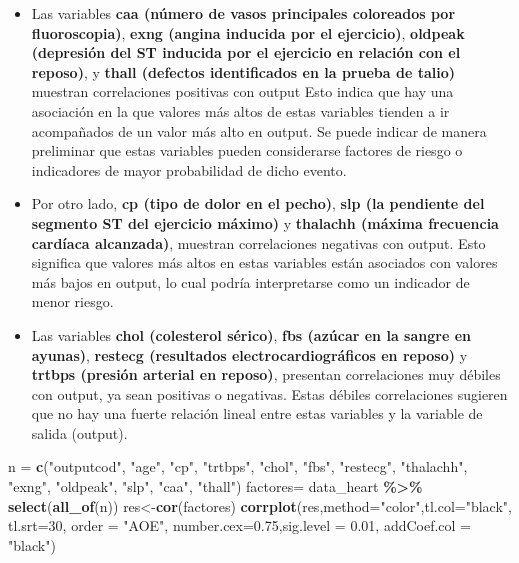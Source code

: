\documentclass[
]{article}
\newenvironment{Shaded}{\begin{snugshade}}{\end{snugshade}}
\newcommand{\AttributeTok}[1]{\textcolor[rgb]{0.13,0.29,0.53}{#1}}
\newcommand{\DecValTok}[1]{\textcolor[rgb]{0.00,0.00,0.81}{#1}}
\newcommand{\FloatTok}[1]{\textcolor[rgb]{0.00,0.00,0.81}{#1}}
\newcommand{\FunctionTok}[1]{\textcolor[rgb]{0.13,0.29,0.53}{\textbf{#1}}}
\newcommand{\NormalTok}[1]{#1}
\newcommand{\OtherTok}[1]{\textcolor[rgb]{0.56,0.35,0.01}{#1}}
\newcommand{\SpecialCharTok}[1]{\textcolor[rgb]{0.81,0.36,0.00}{\textbf{#1}}}
\newcommand{\StringTok}[1]{\textcolor[rgb]{0.31,0.60,0.02}{#1}}
\begin{document}
\begin{itemize}
\item
  Las variables \textbf{caa (número de vasos principales coloreados por
  fluoroscopia)}, \textbf{exng (angina inducida por el ejercicio)},
  \textbf{oldpeak (depresión del ST inducida por el ejercicio en
  relación con el reposo)}, y \textbf{thall (defectos identificados en
  la prueba de talio)} muestran correlaciones positivas con output Esto
  indica que hay una asociación en la que valores más altos de estas
  variables tienden a ir acompañados de un valor más alto en output. Se
  puede indicar de manera preliminar que estas variables pueden
  considerarse factores de riesgo o indicadores de mayor probabilidad de
  dicho evento.
\item
  Por otro lado, \textbf{cp (tipo de dolor en el pecho)}, \textbf{slp
  (la pendiente del segmento ST del ejercicio máximo)} y
  \textbf{thalachh (máxima frecuencia cardíaca alcanzada)}, muestran
  correlaciones negativas con output. Esto significa que valores más
  altos en estas variables están asociados con valores más bajos en
  output, lo cual podría interpretarse como un indicador de menor
  riesgo.
\item
  Las variables \textbf{chol (colesterol sérico)}, \textbf{fbs (azúcar
  en la sangre en ayunas)}, \textbf{restecg (resultados
  electrocardiográficos en reposo)} y \textbf{trtbps (presión arterial
  en reposo)}, presentan correlaciones muy débiles con output, ya sean
  positivas o negativas. Estas débiles correlaciones sugieren que no hay
  una fuerte relación lineal entre estas variables y la variable de
  salida (output).
\end{itemize}

\begin{Shaded}
\begin{Highlighting}[]
\NormalTok{n }\OtherTok{=} \FunctionTok{c}\NormalTok{(}\StringTok{"outputcod"}\NormalTok{, }\StringTok{"age"}\NormalTok{, }\StringTok{"cp"}\NormalTok{, }\StringTok{"trtbps"}\NormalTok{, }\StringTok{"chol"}\NormalTok{, }\StringTok{"fbs"}\NormalTok{, }\StringTok{"restecg"}\NormalTok{, }\StringTok{"thalachh"}\NormalTok{, }\StringTok{"exng"}\NormalTok{, }\StringTok{"oldpeak"}\NormalTok{, }\StringTok{"slp"}\NormalTok{, }\StringTok{"caa"}\NormalTok{, }\StringTok{"thall"}\NormalTok{)}
\NormalTok{factores}\OtherTok{=}\NormalTok{ data\_heart }\SpecialCharTok{\%\textgreater{}\%} \FunctionTok{select}\NormalTok{(}\FunctionTok{all\_of}\NormalTok{(n))}
\NormalTok{res}\OtherTok{\textless{}{-}}\FunctionTok{cor}\NormalTok{(factores)}
\FunctionTok{corrplot}\NormalTok{(res,}\AttributeTok{method=}\StringTok{"color"}\NormalTok{,}\AttributeTok{tl.col=}\StringTok{"black"}\NormalTok{, }\AttributeTok{tl.srt=}\DecValTok{30}\NormalTok{, }\AttributeTok{order =} \StringTok{"AOE"}\NormalTok{,}
\AttributeTok{number.cex=}\FloatTok{0.75}\NormalTok{,}\AttributeTok{sig.level =} \FloatTok{0.01}\NormalTok{, }\AttributeTok{addCoef.col =} \StringTok{"black"}\NormalTok{)}
\end{Highlighting}
\end{Shaded}
\end{document}
